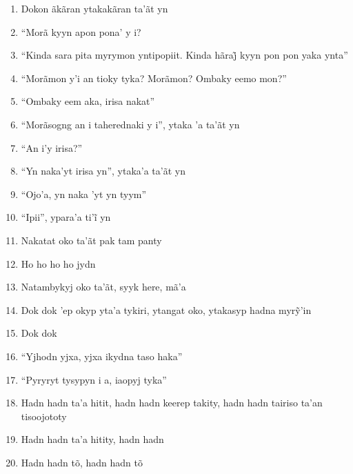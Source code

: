 \begin{enumerate}
 \item Dokon ãkãran ytakakãran ta'ãt yn

 \item ``Morã kyyn apon pona' y i?

 \item ``Kinda sara pita myrymon yntipopiit. Kinda hãraj̃ kyyn pon pon yaka ynta''

 \item ``Morãmon y'i an tioky tyka? Morãmon? Ombaky eemo mon?''

 \item ``Ombaky eem aka, irisa nakat''

 \item ``Morãsogng an i taherednaki y i'', ytaka 'a ta'ãt yn

 \item ``An i'y irisa?''

 \item ``Yn naka'yt irisa yn'', ytaka'a ta'ãt yn

 \item ``Ojo'a, yn naka 'yt yn tyym''

 \item ``Ipii'', ypara’a ti’ĩ yn

 \item Nakatat oko ta'ãt pak tam panty

 \begin{center}\end{center}

 \item Ho ho ho ho jydn

 \item Natambykyj oko ta'ãt, syyk here, mã'a

 \item Dok dok ’ep okyp yta’a tykiri, ytangat oko, ytakasyp hadna myrỹ’in

 \item Dok dok

 \item ``Yjhodn yjxa, yjxa ikydna taso haka''

 \item ``Pyryryt tysypyn i a, iaopyj tyka''

 \item Hadn hadn ta'a hitit, hadn hadn keerep takity, hadn hadn tairiso
 ta'an tisoojototy

 \item Hadn hadn ta'a hitity, hadn hadn

 \item Hadn hadn tõ, hadn hadn tõ


\end{enumerate}
